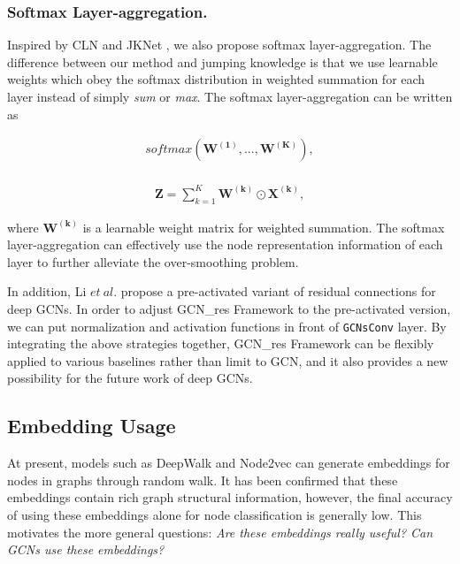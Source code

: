 \documentclass[runningheads]{llncs}
\begin{document}
\subsubsection{Softmax Layer-aggregation.} Inspired by CLN \cite{pham2017column} and JKNet \cite{xu2018representation}, we also propose softmax layer-aggregation. The difference between our method and jumping knowledge is that we use learnable weights which obey the softmax distribution in weighted summation for each layer instead of simply \textsl{sum} or \textsl{max}. The softmax layer-aggregation can be written as 

\begin{equation}
\label{equ:lg1}
\begin{aligned}
    softmax\left(\mathbf{W^{(1)}},...,\mathbf{W^{(K)}}\right), \\
\end{aligned}
\end{equation}

\begin{equation}
\label{equ:lg2}
\begin{aligned}
\bm{Z} = \sum_{k=1}^{K} \mathbf{W^{(k)}} \odot \bm{X^{(k)}},
\end{aligned}
\end{equation}

where $\mathbf{W^{(k)}}$ is a learnable weight matrix for weighted summation. The softmax layer-aggregation can effectively use the node representation
information of each layer to further alleviate the over-smoothing
problem.



In addition, Li $et\ al.$ \cite{li2020deepergcn} propose a pre-activated variant of residual connections for deep GCNs. In order to adjust GCN\_res Framework to the pre-activated version, we can put normalization and activation functions in front of \texttt{GCNsConv} layer. By integrating the above strategies together, GCN\_res Framework can be flexibly applied to
various baselines rather than limit to GCN, and it also provides a new possibility for the
future work of deep GCNs.


\subsection{Embedding Usage}




At present, models such as DeepWalk \cite{perozzi2014deepwalk} and Node2vec \cite{grover2016node2vec} can generate embeddings
for nodes in graphs through random walk. It has been confirmed that these embeddings contain rich graph structural information, however, the final accuracy of using these embeddings alone for node classification is generally low. This motivates the more general questions: \textsl{Are these embeddings really useful? Can GCNs use these embeddings?}
\end{document}

